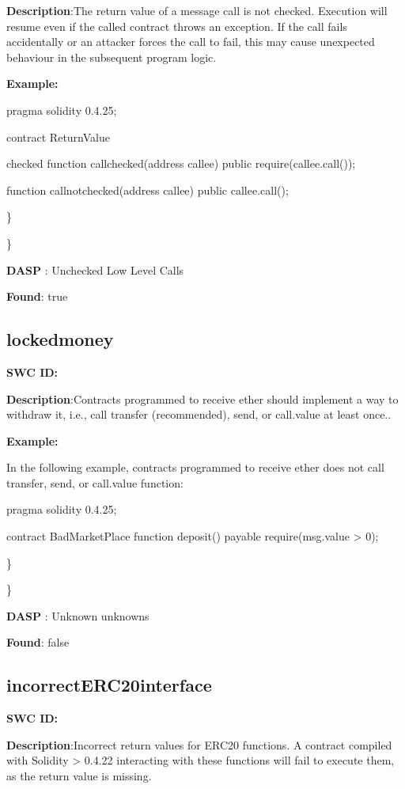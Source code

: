 \documentclass{article}
\begin{document}
\textbf{Description}:The return value of a message call is not checked. Execution will resume even if the called contract throws an exception. If the call fails accidentally or an attacker forces the call to fail, this may cause unexpected behaviour in the subsequent program logic.


\textbf{Example:} 

pragma solidity 0.4.25;

contract ReturnValue {

checked
function callchecked(address callee) public {
    require(callee.call());
  }

  function callnotchecked(address callee) public {
    callee.call();
  }
}

\} 

\} 

\textbf{DASP} : Unchecked Low Level Calls

\textbf{Found}: true

\subsection{locked\textunderscore money} 
\textbf{SWC \textunderscore ID:} 

\textbf{Description}:Contracts programmed to receive ether should implement a way to withdraw it, i.e., call transfer (recommended), send, or call.value at least once..


\textbf{Example:} 

In the following example, contracts programmed to receive ether does not call transfer, send, or call.value function:

pragma solidity 0.4.25;

contract BadMarketPlace {
    function deposit() payable {
        require(msg.value > 0);
    }
}

\} 

\} 

\textbf{DASP} : Unknown unknowns

\textbf{Found}: false

\subsection{incorrect\textunderscore ERC20\textunderscore interface} 
\textbf{SWC \textunderscore ID:} 

\textbf{Description}:Incorrect return values for ERC20 functions. A contract compiled with Solidity > 0.4.22 interacting with these functions will fail to execute them, as the return value is missing.
\end{document}

